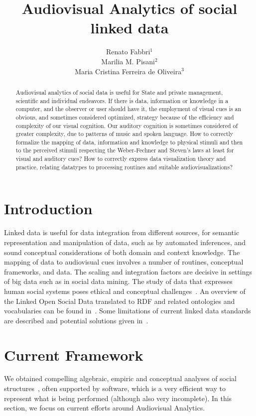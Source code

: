 \documentclass[letterpaper,10pt]{article}
\begin{document}
\title{Audiovisual Analytics of social linked data}

\author{Renato Fabbri$^1$\\
	Marilia M. Pisani$^2$\\
	Maria Cristina Ferreira de Oliveira$^3$
}
\address{$^{1,3}$IFSC/USP, $^2$CCNH/UFABC}

\begin{abstract}
	Audiovisual analytics of social data is useful for State and private
	management, scientific and individual endeavors.
	If there is data, information or knowledge in a computer,
	and the observer or user should have it, the employment of visual cues is an obvious,
	and sometimes considered optimized, strategy because of the efficiency and
	complexity of our visual cognition.
	Our auditory cognition is sometimes considered of greater complexity,
	due to patterns of music and spoken language.
	How to correctly formalize the mapping of data, information
	and knowledge to physical stimuli
	and then to the perceived stimuli
	respecting the Weber-Fechner and Steven's laws at least for visual
	and auditory cues?
	How to correctly express data visualization theory and practice,
	relating datatypes to processing routines and suitable audiovisualizations?
\end{abstract}

\section{Introduction}
Linked data is useful for data integration from different sources,
for semantic representation and manipulation of data,
such as by automated inferences,
and sound conceptual considerations of both domain and context
knowledge.
The mapping of data to audiovisual cues
involves a number of routines, conceptual frameworks,
and data.
The scaling and integration factors are decisive in settings
of big data such as in social data mining.
The study of data that expresses human social systems
poses ethical and conceptual challenges~\cite{an,an2}.
An overview of the Linked Open Social Data translated to
RDF and related ontologies and vocabularies
can be found in~\cite{nuvem1,tese,losd}.
Some limitations of current linked data standards
are described and potential solutions given in~\cite{ont}.

\section{Current Framework}\label{current}
We obtained compelling algebraic, empiric and conceptual
analyses of social structures~\cite{tese,stab},
often supported by software, which is a very efficient
way to represent
what is being performed (although also very incomplete).
In this section, we focus on current efforts around Audiovisual Analytics.
\end{document}
